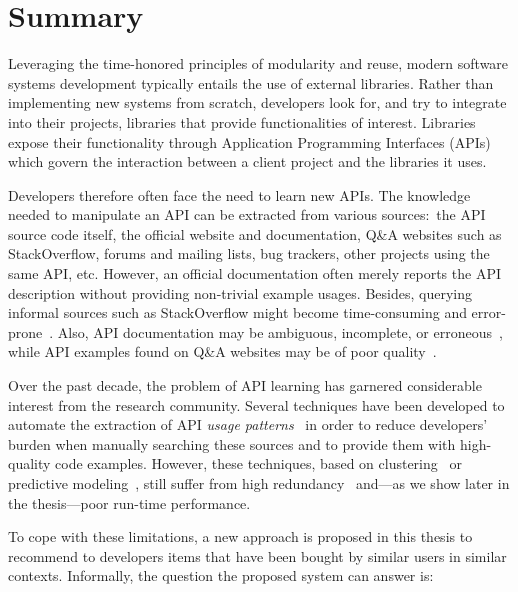 

\section{Summary}
Leveraging the time-honored principles of modularity and 
reuse, modern software 
systems development typically entails the use of external 
libraries.
Rather than implementing new systems from scratch, developers 
look for, and try 
to integrate into their projects, libraries that provide 
functionalities of 
interest. Libraries expose their functionality through 
Application Programming 
Interfaces (APIs) which govern the interaction between a 
client project and the 
libraries it uses.

Developers therefore often face the need to learn new APIs.
The knowledge needed to manipulate an API can be extracted 
from various 
sources:~the API source code itself, the official website and 
documentation, 
Q\&A websites such as StackOverflow, forums and mailing 
lists, bug trackers, 
other projects using the same API, etc.
However, an official documentation often merely reports the 
API description 
without providing non-trivial example usages. Besides, 
querying informal 
sources such as StackOverflow might become time-consuming and 
error-prone~\cite{robillard2009makes}.
Also, API documentation may be ambiguous, incomplete, or 
erroneous~\cite{uddin2015api}, while API examples found on 
Q\&A websites may be 
of poor quality~\cite{nasehi2012makes}.

Over the past decade, the problem of API learning has 
garnered considerable 
interest from the research community.
Several techniques have been developed to automate the 
extraction of API 
\emph{usage 
patterns}~\cite{Robillard:2013:AAP:2498733.2498776} in order 
to 
reduce developers' burden when manually searching these 
sources and to provide 
them with high-quality code examples. However, these 
techniques, based on 
clustering~\cite{Niu2017API, Wang2013Mining, Zhong2009MAPO} 
or predictive 
modeling~\cite{Fowkes:2016:PPA:2950290.2950319}, still suffer 
from high 
redundancy~\cite{Fowkes:2016:PPA:2950290.2950319} and---as we 
show later in the 
thesis---poor run-time performance.

To cope with these limitations, a new approach is proposed in 
this thesis to 
recommend to developers items that have been bought by 
similar users in similar 
contexts. Informally, the question the proposed system can 
answer is:


